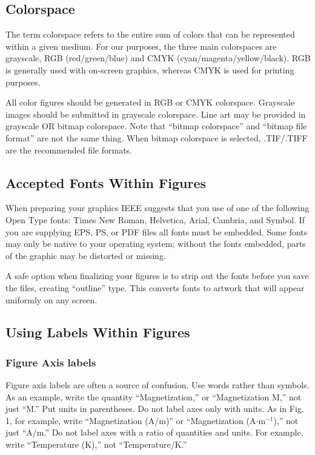 \documentclass[journal,twoside,web]{ieeecolor}
\begin{document}
\subsection{Colorspace}
The term colorspace refers to the entire sum of colors that can be 
represented within a given medium. For our purposes, the three main colorspaces
are grayscale, RGB (red/green/blue) and CMYK (cyan/magenta/yellow/black).
RGB is generally used with on-screen graphics, whereas CMYK is used for printing purposes.

All color figures should be generated in RGB or CMYK colorspace. Grayscale 
images should be submitted in grayscale colorspace. Line art may be 
provided in grayscale OR bitmap colorspace. Note that ``bitmap colorspace'' 
and ``bitmap file format'' are not the same thing. When bitmap colorspace 
is selected, .TIF/.TIFF are the recommended file formats.

\subsection{Accepted Fonts Within Figures}
When preparing your graphics IEEE suggests that you use of one of the 
following Open Type fonts: Times New Roman, Helvetica, Arial, Cambria, and 
Symbol. If you are supplying EPS, PS, or PDF files all fonts must be 
embedded. Some fonts may only be native to your operating system; without 
the fonts embedded, parts of the graphic may be distorted or missing.

A safe option when finalizing your figures is to strip out the fonts before 
you save the files, creating ``outline'' type. This converts fonts to 
artwork that will appear uniformly on any screen.

\subsection{Using Labels Within Figures}

\subsubsection{Figure Axis labels}
Figure axis labels are often a source of confusion. Use words rather than 
symbols. As an example, write the quantity ``Magnetization,'' or 
``Magnetization M,'' not just ``M.'' Put units in parentheses. Do not label 
axes only with units. As in Fig. 1, for example, write ``Magnetization 
(A/m)'' or ``Magnetization (A$\cdot$m$^{-1}$),'' not just ``A/m.''
Do not label axes with a ratio of quantities and units.
For example, write ``Temperature (K),'' not ``Temperature/K.'' 
\end{document}
